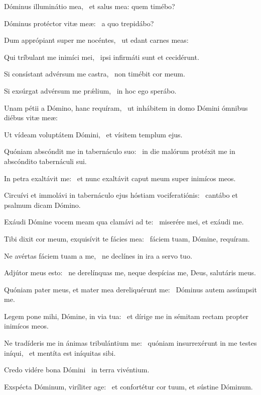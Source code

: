 \item Dóminus illuminátio mea,~\psstar{} et salus mea: quem timébo?

\item Dóminus protéctor vitæ meæ:~\psstar{} a quo trepidábo?

\item Dum apprópiant super me nocéntes,~\psstar{} ut edant carnes meas:

\item Qui tríbulant me inimíci mei,~\psstar{} ipsi infirmáti sunt et cecidérunt.

\item Si consístant advérsum me castra,~\psstar{} non timébit cor meum.

\item Si exsúrgat advérsum me prǽlium,~\psstar{} in hoc ego sperábo.

\item Unam pétii a Dómino, hanc requíram,~\psstar{} ut inhábitem in domo Dómini ómnibus diébus vitæ meæ:

\item Ut vídeam voluptátem Dómini,~\psstar{} et vísitem templum ejus.

\item Quóniam abscóndit me in tabernáculo suo:~\psstar{} in die malórum protéxit me in abscóndito tabernáculi sui.

\item In petra exaltávit me:~\psstar{} et nunc exaltávit caput meum super inimícos meos.

\item Circuívi et immolávi in tabernáculo ejus hóstiam vociferatiónis:~\psstar{} cantábo et psalmum dicam Dómino.

\item Exáudi Dómine vocem meam qua clamávi ad te:~\psstar{} miserére mei, et exáudi me.

\item Tibi dixit cor meum, exquisívit te fácies mea:~\psstar{} fáciem tuam, Dómine, requíram.

\item Ne avértas fáciem tuam a me,~\psstar{} ne declínes in ira a servo tuo.

\item Adjútor meus esto:~\psstar{} ne derelínquas me, neque despícias me, Deus, salutáris meus.

\item Quóniam pater meus, et mater mea dereliquérunt me:~\psstar{} Dóminus autem assúmpsit me.

\item Legem pone mihi, Dómine, in via tua:~\psstar{} et dírige me in sémitam rectam propter inimícos meos.

\item Ne tradíderis me in ánimas tribulántium me:~\pscross{} quóniam insurrexérunt in me testes iníqui,~\psstar{} et mentíta est iníquitas sibi.

\item Credo vidére bona Dómini~\psstar{} in terra vivéntium.

\item Exspécta Dóminum, viríliter age:~\psstar{} et confortétur cor tuum, et sústine Dóminum.

